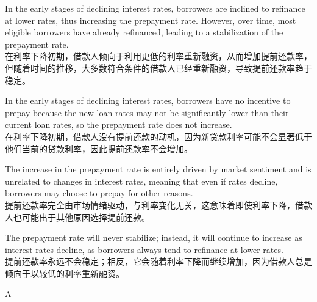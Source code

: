 \documentclass{article}
\begin{document}
        \begin{choices}
            \item In the early stages of declining interest rates, borrowers are inclined to refinance at lower rates, thus increasing the prepayment rate. However, over time, most eligible borrowers have already refinanced, leading to a stabilization of the prepayment rate.\\
            在利率下降初期，借款人倾向于利用更低的利率重新融资，从而增加提前还款率，但随着时间的推移，大多数符合条件的借款人已经重新融资，导致提前还款率趋于稳定。
            \item In the early stages of declining interest rates, borrowers have no incentive to prepay because the new loan rates may not be significantly lower than their current loan rates, so the prepayment rate does not increase.\\
            在利率下降初期，借款人没有提前还款的动机，因为新贷款利率可能不会显著低于他们当前的贷款利率，因此提前还款率不会增加。
            \item The increase in the prepayment rate is entirely driven by market sentiment and is unrelated to changes in interest rates, meaning that even if rates decline, borrowers may choose to prepay for other reasons.\\
            提前还款率完全由市场情绪驱动，与利率变化无关，这意味着即使利率下降，借款人也可能出于其他原因选择提前还款。
            \item The prepayment rate will never stabilize; instead, it will continue to increase as interest rates decline, as borrowers always tend to refinance at lower rates.\\
            提前还款率永远不会稳定；相反，它会随着利率下降而继续增加，因为借款人总是倾向于以较低的利率重新融资。
        \end{choices}
        
        \begin{correctanswer}
            A
        \end{correctanswer}
        
\end{document}
